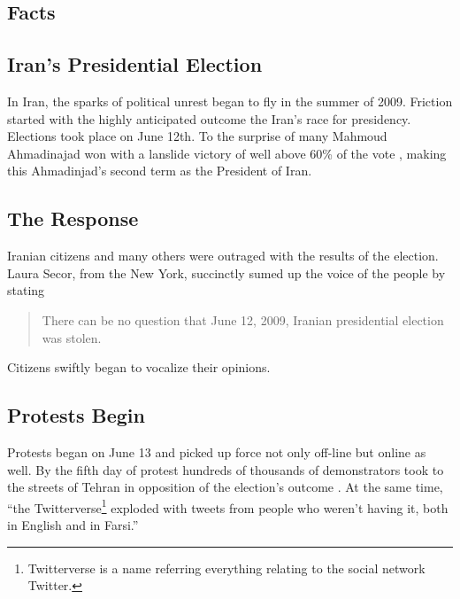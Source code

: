 \documentclass[11pt]{article}
\begin{document}
\begin{multicols}{2}
\setcounter{page}{1}
\section{Facts} 

\subsection{Iran's Presidential Election}

In Iran, the sparks of political unrest began to fly in the summer of 2009.
Friction started with the highly anticipated outcome the Iran's race for
presidency. Elections took place on June 12th. To the surprise of many Mahmoud
Ahmadinajad won with a lanslide victory of well above 60\% of the vote
\cite{TheIranianVote, IranianElectionResultsByProvince}, making this
Ahmadinjad's second term as the President of Iran.

\subsection{The Response}

Iranian citizens and many others were outraged with the results of the election.
Laura Secor, from the New York, succinctly sumed up the voice of the people by
stating \begin{quotation} There can be no question that June 12, 2009, Iranian
presidential election was stolen. \cite{TheIranianVote}\end{quotation} Citizens
swiftly began to vocalize their opinions.

\subsection{Protests Begin}

Protests began on June 13 and picked up force not only off-line but online as
well. By the fifth day of protest hundreds of thousands of demonstrators took to
the streets of Tehran in opposition of the election's outcome
\cite{IranProtestsFifthDayOfUnrest}. At the same time, ``the
Twitterverse\footnote{Twitterverse is a name referring everything relating to
the social network Twitter.} exploded with tweets from people who weren't having
it, both in English and in Farsi.'' \cite{WhyTwitterIsTheMedium}


\end{multicols}
\end{document}
